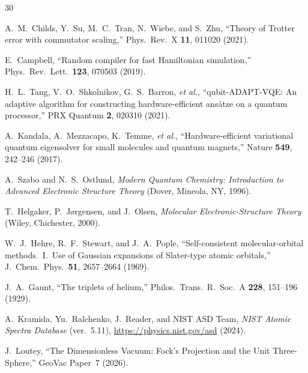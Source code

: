 \documentclass[aps,pra,twocolumn,superscriptaddress,longbibliography]{revtex4-2}
\begin{document}
\begin{thebibliography}{30}

A.~M.~Childs, Y.~Su, M.~C.~Tran, N.~Wiebe, and S.~Zhu,
``Theory of Trotter error with commutator scaling,''
Phys.\ Rev.\ X \textbf{11}, 011020 (2021).

E.~Campbell,
``Random compiler for fast Hamiltonian simulation,''
Phys.\ Rev.\ Lett.\ \textbf{123}, 070503 (2019).


H.~L.~Tang, V.~O.~Shkolnikov, G.~S.~Barron, \textit{et al.},
``qubit-ADAPT-VQE: An adaptive algorithm for constructing hardware-efficient
ans\"atze on a quantum processor,''
PRX Quantum \textbf{2}, 020310 (2021).

A.~Kandala, A.~Mezzacapo, K.~Temme, \textit{et al.},
``Hardware-efficient variational quantum eigensolver for small molecules and
quantum magnets,''
Nature \textbf{549}, 242--246 (2017).


A.~Szabo and N.~S.~Ostlund,
\textit{Modern Quantum Chemistry: Introduction to Advanced Electronic
Structure Theory}
(Dover, Mineola, NY, 1996).

T.~Helgaker, P.~J{\o}rgensen, and J.~Olsen,
\textit{Molecular Electronic-Structure Theory}
(Wiley, Chichester, 2000).


W.~J.~Hehre, R.~F.~Stewart, and J.~A.~Pople,
``Self-consistent molecular-orbital methods.\ I.\ Use of Gaussian
expansions of Slater-type atomic orbitals,''
J.\ Chem.\ Phys.\ \textbf{51}, 2657--2664 (1969).


J.~A.~Gaunt,
``The triplets of helium,''
Philos.\ Trans.\ R.\ Soc.\ A \textbf{228}, 151--196 (1929).


A.~Kramida, Yu.~Ralchenko, J.~Reader, and NIST ASD Team,
\textit{NIST Atomic Spectra Database} (ver.~5.11),
\url{https://physics.nist.gov/asd} (2024).


J.~Loutey,
``The Dimensionless Vacuum: Fock's Projection and the Unit Three-Sphere,''
GeoVac Paper~7 (2026).


\end{thebibliography}
\end{document}
